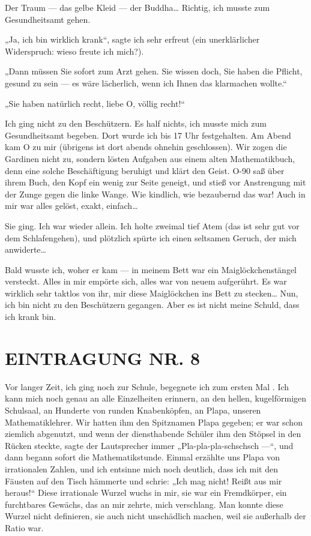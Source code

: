 Der Traum — das gelbe Kleid — der Buddha\ldots{}
Richtig, ich musste zum Gesundheitsamt gehen.

„Ja, ich bin wirklich
krank“, sagte ich sehr erfreut (ein unerklärlicher Widerspruch:
wieso freute ich mich?).

„Dann müssen Sie sofort zum Arzt gehen.
Sie wissen doch, Sie haben die Pflicht, gesund zu sein — es wäre
lächerlich, wenn ich Ihnen das klarmachen wollte.“

„Sie haben natürlich recht, liebe O, völlig recht!“

Ich ging nicht zu den
Beschützern. Es half nichts, ich musste mich zum Gesundheitsamt
begeben. Dort wurde ich bis 17 Uhr festgehalten. Am Abend kam O zu
mir (übrigens ist dort abends ohnehin geschlossen). Wir zogen die
Gardinen nicht zu, sondern lösten Aufgaben aus einem alten
Mathematikbuch, denn eine solche Beschäftigung beruhigt und klärt
den Geist. O-90 saß über ihrem Buch, den Kopf ein wenig zur Seite
geneigt, und stieß vor Anstrengung mit der Zunge gegen die linke
Wange. Wie kindlich, wie bezaubernd das war! Auch in mir war alles
gelöst, exakt, einfach\ldots{}

Sie ging. Ich war wieder allein. Ich holte zweimal tief Atem (das
ist sehr gut vor dem Schlafengehen), und plötzlich spürte ich einen
seltsamen Geruch, der mich anwiderte\ldots{}

Bald wusste ich, woher er kam — in meinem Bett war ein
Maiglöckchenstängel versteckt. Alles in mir empörte sich, alles war
von neuem aufgerührt. Es war wirklich sehr taktlos von ihr, mir
diese Maiglöckchen ins Bett zu stecken\ldots{} Nun, ich bin nicht zu den
Beschützern gegangen. Aber es ist nicht meine Schuld, dass ich
krank bin.

\section{EINTRAGUNG NR. 8}

Vor langer Zeit, ich ging noch zur Schule, begegnete ich zum ersten
Mal \wurzel{}. Ich kann mich noch genau an alle Einzelheiten erinnern, an
den hellen, kugelförmigen Schulsaal, an Hunderte von runden
Knabenköpfen, an Plapa, unseren Mathematiklehrer. Wir hatten ihm
den Spitznamen Plapa gegeben; er war schon ziemlich abgenutzt, und
wenn der diensthabende Schüler ihm den Stöpsel in den Rücken
steckte, sagte der Lautsprecher immer „Pla-pla-pla-schschsch —“,
und dann begann sofort die Mathematikstunde. Einmal erzählte uns
Plapa von irrationalen Zahlen, und ich entsinne mich noch deutlich,
dass ich mit den Fäusten auf den Tisch hämmerte und schrie: „Ich
mag \wurzel{} nicht! Reißt \wurzel{} aus mir heraus!“ Diese irrationale Wurzel
wuchs in mir, sie war ein Fremdkörper, ein furchtbares Gewächs, das
an mir zehrte, mich verschlang. Man konnte diese Wurzel nicht
definieren, sie auch nicht unschädlich machen, weil sie außerhalb
der Ratio war.


